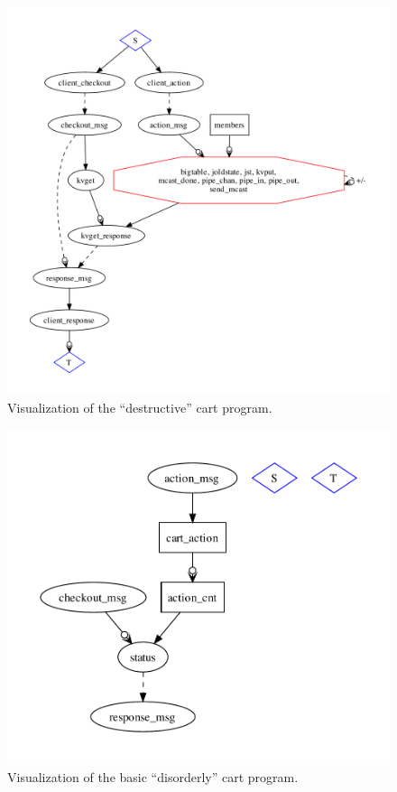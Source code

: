 \begin{figure}[t]
\centering
\includegraphics[width=0.8\linewidth]{fig/destructive_kvs.pdf}
\vspace{-10pt}
\caption{Visualization of the ``destructive'' cart program.  }
\label{fig:pdg-destructive-kvs-analysis}
\vspace{-2pt}
\end{figure}

\begin{figure}[t]
\centering
\includegraphics[width=0.8\linewidth]{fig/disorderly_base.pdf}
\vspace{-10pt}
\caption{Visualization of the basic ``disorderly'' cart program.}
\label{fig:pdg-disorderly-base}
\vspace{-2pt}
\end{figure}

